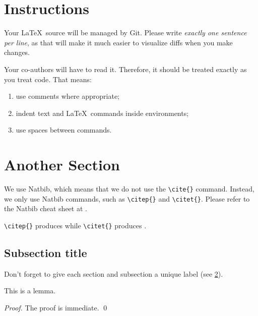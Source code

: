 \documentclass[smallextended]{svjour3}       %
\begin{document}
\small


\normalsize

\appendix
\clearpage

\section{Instructions}%
\label{sec:instructions}

Your \LaTeX\ source will be managed by Git.
Please write \emph{exactly one sentence per line}, as that will make it much easier to visualize diffs when you make changes.

Your co-authors will have to read it.
Therefore, it should be treated exactly as you treat code.
That means:
\begin{enumerate}
  \item use comments where appropriate;
  \item indent text and \LaTeX\ commands inside environments;
  \item use spaces between commands.
\end{enumerate}

\section{Another Section}%
\label{sec:more-stuff}

We use Natbib, which means that we do not use the \verb|\cite{}| command.
Instead, we only use Natbib commands, such as \verb|\citep{}| and \verb|\citet{}|.
Please refer to the Natbib cheat sheet at .

\verb|\citep{}| produces \citep{aravkin-baraldi-orban-2022} while \verb|\citet{}| produces \citet{aravkin-baraldi-orban-2022}.

\subsection{Subsection title}%
\label{sec:2}

Don't forget to give each section and subsection a unique label (see \cref{sec:more-stuff}).

\begin{lemma}%
  \label{lem:important}
  This is a lemma.
\end{lemma}

\begin{proof}
  The proof is immediate.
  \qed
\end{proof}
\end{document}
